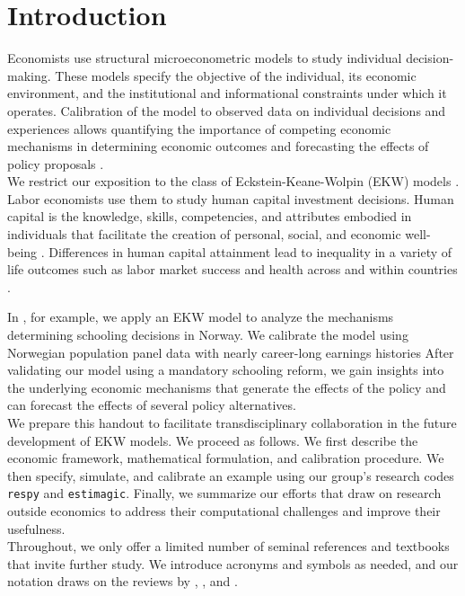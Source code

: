 \section{Introduction}
\noindent Economists use structural microeconometric models to study individual decision-making. These models specify the objective of the individual, its economic environment, and the institutional and informational constraints under which it operates. Calibration of the model to observed data on individual decisions and experiences allows quantifying the importance of competing economic mechanisms in determining economic outcomes and forecasting the effects of policy proposals \citep{Wolpin.2013}.\\

\noindent We restrict our exposition to the class of Eckstein-Keane-Wolpin (EKW) models \citep{Adda.2017, Blundell.2016, Keane.1997}. Labor economists use them to study human capital investment decisions. Human capital is the knowledge, skills, competencies, and attributes embodied in individuals that facilitate the creation of personal, social, and economic well-being \citep{Becker.1964}. Differences in human capital attainment lead to inequality in a variety of life outcomes such as labor market success and health across and within countries \citep{OECD.2001}.

In \citet{Bhuller.2018}, for example, we apply an EKW model to analyze the mechanisms determining schooling decisions in Norway. We calibrate the model using Norwegian population panel data with nearly career-long earnings histories  After validating our model using a mandatory schooling reform, we gain insights into the underlying economic mechanisms that generate the effects of the policy and can forecast the effects of several policy alternatives.\\

\noindent We prepare this handout to facilitate transdisciplinary collaboration in the future development of EKW models. We proceed as follows. We first describe the economic framework, mathematical formulation, and calibration procedure. We then specify, simulate, and calibrate an example using our group's research codes \verb+respy+ and \verb+estimagic+. Finally, we summarize our efforts that draw on research outside economics to address their computational challenges and improve their usefulness.\\

\noindent Throughout, we only offer a limited number of seminal references and textbooks that invite further study. We introduce acronyms and symbols as needed, and our notation draws on the reviews by \cite{Aguirregabiria.2010}, \cite{Arcidiacono.2011}, and \cite{Puterman.1994}.
